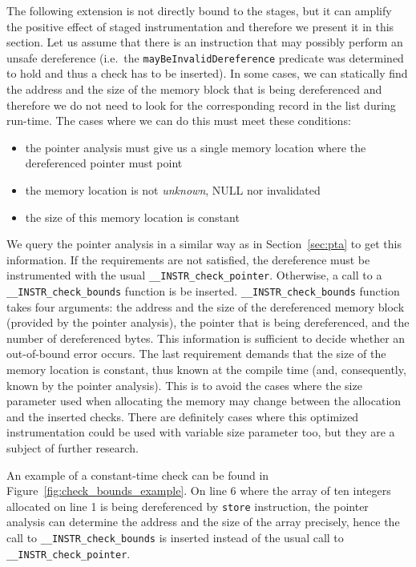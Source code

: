 The following extension is not directly bound to the stages, but it
can amplify the positive effect of staged instrumentation and
therefore we present it in this section. Let us assume that there is
an instruction that may possibly perform an unsafe dereference
(i.e.~the \texttt{mayBeInvalidDereference} predicate was determined to
hold and thus a check has to be inserted). In some cases, we can
statically find the address and the size of the memory block that is
being dereferenced and therefore we do not need to look for the
corresponding record in the list during run-time. The cases where we
can do this must meet these conditions:
\begin{itemize}
\item the pointer analysis must give us a single memory location where the
dereferenced pointer must point
\item the memory location is not \emph{unknown}, NULL nor invalidated
\item the size of this memory location is constant
\end{itemize}

We query the pointer analysis in a similar way as in
Section~\ref{sec:pta} to get this information.  If the requirements
are not satisfied, the dereference must be instrumented with the usual
\texttt{\_\_INSTR\_check\_pointer}. Otherwise, a call to a
\texttt{\_\_INSTR\_check\_bounds} function is be
inserted. \texttt{\_\_INSTR\_check\_bounds} function takes four
arguments: the address and the size of the dereferenced memory block
(provided by the pointer analysis), the pointer that is being
dereferenced, and the number of dereferenced bytes.  This information
is sufficient to decide whether an out-of-bound error occurs.  The
last requirement demands that the size of the memory location is
constant, thus known at the compile time (and, consequently, known by
the pointer analysis).  This is to avoid the cases where the size
parameter used when allocating the memory may change between the
allocation and the inserted checks.  There are definitely cases where
this optimized instrumentation could be used with variable size
parameter too, but they are a subject of further research.

An example of a constant-time check can be found in
Figure~\ref{fig:check_bounds_example}. On line 6 where the array of ten
integers allocated on line 1 is being dereferenced by \texttt{store}
instruction, the pointer analysis can determine the address and the size of the
array precisely, hence the call to \texttt{\_\_INSTR\_check\_bounds} is
inserted instead of the usual call to \texttt{\_\_INSTR\_check\_pointer}.

